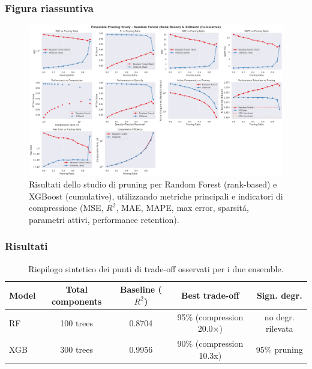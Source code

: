 \documentclass[a4paper,12pt]{report}
\begin{document}
	\subsubsection{Figura riassuntiva}
	\begin{figure}[H]
		\centering
		\includegraphics[width=\textwidth]{img/abl_xgbvsrf_car.png}
		\caption{Risultati dello studio di pruning per Random Forest (rank-based) e XGBoost (cumulative), utilizzando metriche principali e indicatori di compressione (MSE, \(R^2\), MAE, MAPE, max error, sparsitá, parametri attivi, performance retention).}
	\end{figure}
	
	\subsubsection{Risultati}
	\begin{table}[H]
		\centering
		\setlength{\tabcolsep}{4pt}
		\begin{tabular}{lcccc}
			\toprule
			\textbf{Model} & \textbf{Total components} & \textbf{Baseline (\(R^2\))} & \textbf{Best trade-off} & \textbf{Sign. degr.} \\
			\midrule
			RF        & 100 trees & 0.8704 & 95\% (compression 20.0×) & no degr. rilevata \\
			XGB       & 300 trees & 0.9956 & 90\% (compression 10.3x) & 95\% pruning \\
			\bottomrule
		\end{tabular}
		\caption{Riepilogo sintetico dei punti di trade-off osservati per i due ensemble.}
	\end{table}
	
\end{document}
